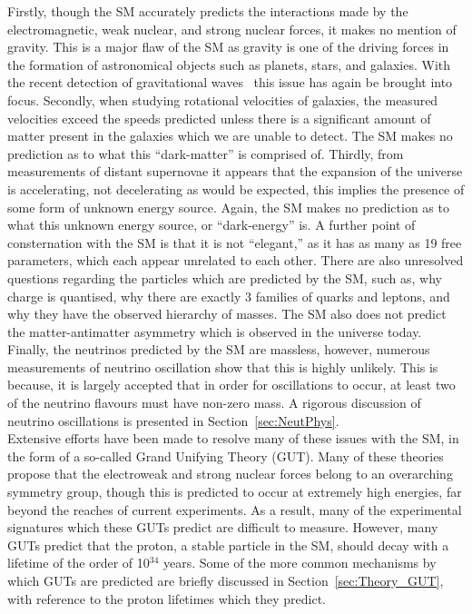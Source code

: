 Firstly, though the SM accurately predicts the interactions made by the electromagnetic, weak nuclear, and strong nuclear forces, it makes no mention of gravity. This is a major flaw of the SM as gravity is one of the driving forces in the formation of astronomical objects such as planets, stars, and galaxies. With the recent detection of gravitational waves~\citep{LIGO} this issue has again be brought into focus. Secondly, when studying rotational velocities of galaxies, the measured velocities exceed the speeds predicted unless there is a significant amount of matter present in the galaxies which we are unable to detect. The SM makes no prediction as to what this ``dark-matter'' is comprised of. Thirdly, from measurements of distant supernovae it appears that the expansion of the universe is accelerating, not decelerating as would be expected, this implies the presence of some form of unknown energy source. Again, the SM makes no prediction as to what this unknown energy source, or ``dark-energy'' is. A further point of consternation with the SM is that it is not ``elegant,'' as it has as many as 19 free parameters, which each appear unrelated to each other. There are also unresolved questions regarding the particles which are predicted by the SM, such as, why charge is quantised, why there are exactly 3 families of quarks and leptons, and why they have the observed hierarchy of masses. The SM also does not predict the matter-antimatter asymmetry which is observed in the universe today. Finally, the neutrinos predicted by the SM are massless, however, numerous measurements of neutrino oscillation show that this is highly unlikely. This is because, it is largely accepted that in order for oscillations to occur, at least two of the neutrino flavours must have non-zero mass. A rigorous discussion of neutrino oscillations is presented in Section~\ref{sec:NeutPhys}. \\

Extensive efforts have been made to resolve many of these issues with the SM, in the form of a so-called Grand Unifying Theory (GUT). Many of these theories propose that the electroweak and strong nuclear forces belong to an overarching symmetry group, though this is predicted to occur at extremely high energies, far beyond the reaches of current experiments. As a result, many of the experimental signatures which these GUTs predict are difficult to measure. However, many GUTs predict that the proton, a stable particle in the SM, should decay with a lifetime of the order of 10$^{34}$ years. Some of the more common mechanisms by which GUTs are predicted are briefly discussed in Section~\ref{sec:Theory_GUT}, with reference to the proton lifetimes which they predict. \\

